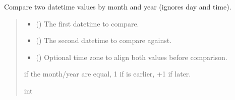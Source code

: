 \documentclass[letterpaper,10pt,english]{sphinxmanual}
\begin{document}
\begin{fulllineitems}

\begin{fulllineitems}
\label{\detokenize{apache_commons_validator_python.routines:apache_commons_validator_python.routines.date_validator.DateValidator.compare_months}}
\pysigstartsignatures
{}
\pysigstopsignatures
\sphinxAtStartPar
Compare two datetime values by month and year (ignores day and time).
\begin{quote}\begin{description}
\begin{itemize}
\item {} 
\sphinxAtStartPar
{} () \textendash{} The first datetime to compare.

\item {} 
\sphinxAtStartPar
{} () \textendash{} The second datetime to compare against.

\item {} 
\sphinxAtStartPar
{} (\sphinxstyleliteralemphasis{\sphinxupquote{{[}}}\sphinxstyleliteralemphasis{\sphinxupquote{{]}}}) \textendash{} Optional time zone to align both values before comparison.

\end{itemize}

 if the month/year are equal, \sphinxhyphen{}1 if  is earlier, +1 if later.

\sphinxAtStartPar
int


\end{description}
\end{quote}
\end{fulllineitems}
\end{fulllineitems}
\end{document}

